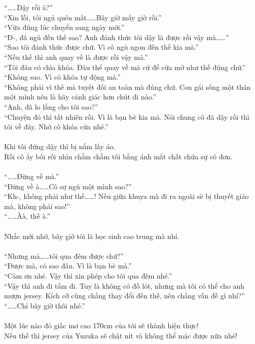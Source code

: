 \documentclass[12pt,a4paper, twosides]{book}
\begin{document}
“……Dậy rồi à?”\\
“Xin lỗi, tôi ngủ quên mất……Bây giờ mấy giờ rồi.”\\
“Vừa đúng lúc chuyển sang ngày mới.”\\
“Đ-, đã ngủ đến thế sao? Anh đánh thức tôi dậy là được rồi vậy mà……”\\
“Sao tôi đánh thức được chứ. Vì cô ngủ ngon đến thế kia mà.”\\
“Nếu thế thì anh quay về là được rồi vậy mà.”\\
“Tôi đâu có chìa khóa. Đâu thể quay về mà cứ để cửa mở như thế đúng chứ.”\\
“Không sao. Vì có khóa tự động mà.”\\
“Không phải vì thế mà tuyệt đối an toàn mà đúng chứ. Con gái sống một thân một mình nên là hãy cảnh giác hơn chút đi nào.”\\
“Anh, đã lo lắng cho tôi sao?”\\
“Chuyện đó thì tất nhiên rồi. Vì là bạn bè kia mà. Nói chung cô đã dậy rồi thì tôi về đây. Nhờ cô khóa cửa nhé.”\\
\\
Khi tôi đứng dậy thì bị nắm lấy áo.\\
Rồi cô ấy bối rối nhìn chằm chằm tôi bằng ánh mắt chất chứa sự cô đơn.\\
\\
“……Đừng về mà.”\\
“Đừng về à……Cô sợ ngủ một mình sao?”\\
“Kh-, không phải như thế……! Nếu giữa khuya mà đi ra ngoài sẽ bị thuyết giáo mà, không phải sao!”\\
“……Àà, thế à.”\\
\\
Nhắc mới nhớ, bây giờ tôi là học sinh cao trung mà nhỉ.\\
\\
“Nhưng mà……tôi qua đêm được chứ?”\\
“Được mà, có sao đâu. Vì là bạn bè mà.”\\
“Cảm ơn nhé. Vậy thì xin phép cho tôi qua đêm nhé.”\\
“Vậy thì anh đi tắm đi. Tuy là không có đồ lót, nhưng mà tôi có thể cho anh mượn jersey. Kích cỡ cũng chẳng thay đổi đến thế, nên chẳng vấn đề gì nhỉ?”\\
“……Chỉ bây giờ thôi nhé.”\\
\\
Một lúc nào đó giấc mơ cao 170cm của tôi sẽ thành hiện thực!\\
Nếu thế thì jersey của Yuzuka sẽ chật nít và không thể mặc được nữa nhé!\\
\end{document}
